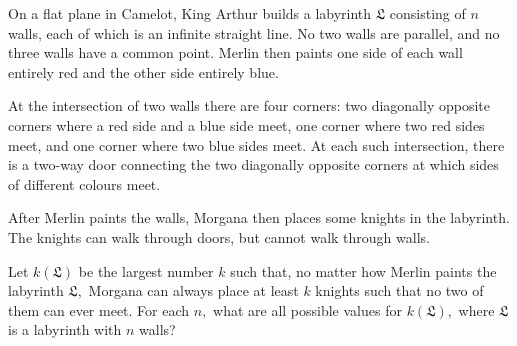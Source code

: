 On a flat plane in Camelot, King Arthur builds a labyrinth $\mathfrak{L}$ consisting of $n$ walls, each of which is an infinite straight line. No two walls are parallel, and no three walls have a common point. Merlin then paints one side of each wall entirely red and the other side entirely blue.

At the intersection of two walls there are four corners: two diagonally opposite corners where a red side and a blue side meet, one corner where two red sides meet, and one corner where two blue sides meet. At each such intersection, there is a two-way door connecting the two diagonally opposite corners at which sides of different colours meet.

After Merlin paints the walls, Morgana then places some knights in the labyrinth. The knights can walk through doors, but cannot walk through walls.

Let $k(\mathfrak{L})$ be the largest number $k$ such that, no matter how Merlin paints the labyrinth $\mathfrak{L},$ Morgana can always place at least $k$ knights such that no two of them can ever meet. For each $n,$ what are all possible values for $k(\mathfrak{L}),$ where $\mathfrak{L}$ is a labyrinth with $n$ walls?